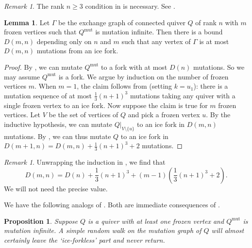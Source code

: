 \documentclass[12pt]{amsart}
\newtheorem{prop}[thm]{Proposition}
\theoremstyle{definition}
\newtheorem{lemma}[thm]{Lemma}
\theoremstyle{remark}
\newtheorem{rem}[thm]{Remark}
\numberwithin{equation}{section}
\newcommand{\mut} {\text{mut}}
\newcommand{\cut}{\setminus}
\begin{document}
\begin{rem}
The rank $n \geq 3$ condition in  is necessary. See .
\end{rem}

\begin{lemma}
\label{lem: ice fork in finite mutations}
Let $\Gamma$ be the exchange graph of  connected quiver $Q$ of rank $n$ with $m$ frozen vertices such that $Q^{\mut}$ is mutation infinite.  Then there is a bound $D(m,n)$ depending only on $n$ and $m$ such that any vertex of $\Gamma$ is at most $D(m,n)$ mutations from an ice fork.  
\end{lemma}
\begin{proof}
By , we can mutate $Q^{\mut}$ to a fork with at most $D(n)$ mutations. 
So we may assume $Q^{\mut}$ is a fork.
We argue by induction on the number of frozen vertices $m$. 
When $m=1$, the claim follows from \cite[Corollary 3.10]{Warkentin} (setting $k = u_1$): there is a mutation sequence of at most $\frac{1}{3}(n+1)^3$ mutations taking any quiver with a single frozen vertex to an ice fork.
Now suppose the claim is true for $m$ frozen vertices. Let $V$ be the set of vertices of $Q$ and pick a frozen vertex $u$.
By the inductive hypothesis, we can mutate $Q|_{V \cut \{u\}}$ to an ice fork in $D(m,n)$ mutations.
By , we can thus mutate $Q$ to an ice fork in $D(m+1,n) = D(m,n) + \frac 1 3 (n+1)^3 + 2$ mutations.
\end{proof}

\begin{rem}
Unwrapping the induction in , we find that $$D(m,n) = D(n) + \frac{1}{3}(n+1)^3 + (m-1)\left(\frac{1}{3}(n+1)^3 + 2\right).$$ We will not need the precise value.
\end{rem}



We have the following analogs of \cite[Propositions~5.2, 5.4]{Warkentin}. 
Both are immediate consequences of .
\begin{prop}
\label{prop: ice forks get wandered into}
Suppose $Q$ is a quiver with at least one frozen vertex and $Q^{\mut}$ is mutation infinite.
A simple random walk on the mutation graph of $Q$ will almost certainly leave the `ice-forkless' part and never return.
\end{prop}
\end{document}
